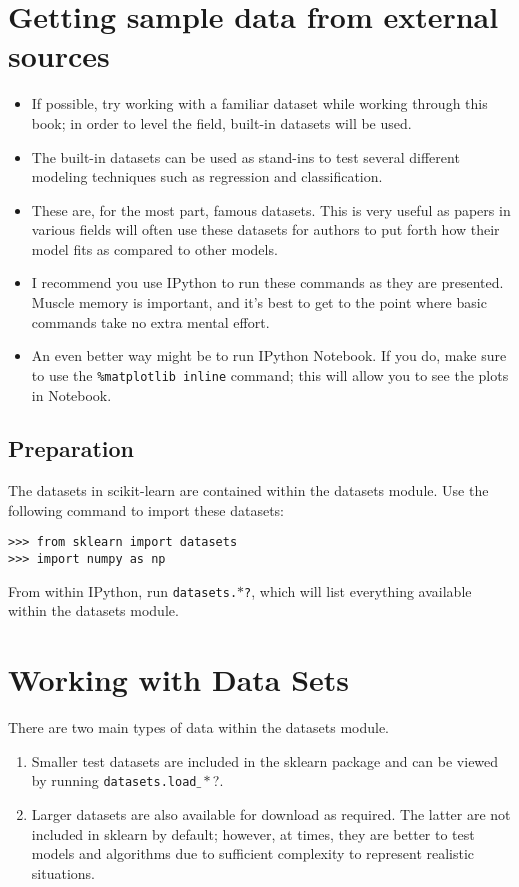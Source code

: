 \documentclass[SKL-MASTER.tex]{subfiles}
\begin{document}
\Large
\section*{Getting sample data from external sources}
\begin{itemize}
\item If possible, try working with a familiar dataset while working through this book; in order to level
the field, built-in datasets will be used. 
\item The built-in datasets can be used as stand-ins to test
several different modeling techniques such as regression and classification.
\item  These are, for the
most part, famous datasets. This is very useful as papers in various fields will often use these
datasets for authors to put forth how their model fits as compared to other models.

\item I recommend you use IPython to run these commands as they are
presented. Muscle memory is important, and it's best to get to the
point where basic commands take no extra mental effort. \item An even
better way might be to run IPython Notebook. If you do, make sure
to use the \texttt{\%matplotlib inline} command; this will allow you
to see the plots in Notebook.
\end{itemize}

\subsection*{Preparation}
The datasets in scikit-learn are contained within the datasets module. Use the following
command to import these datasets:
\begin{framed}
\begin{verbatim}
>>> from sklearn import datasets
>>> import numpy as np
\end{verbatim}
\end{framed}
From within IPython, run \texttt{datasets.$\ast$?}, which will list everything available within the
datasets module.
\section*{Working with Data Sets}
There are two main types of data within the datasets module. 
\begin{enumerate}
\item Smaller test datasets
are included in the sklearn package and can be viewed by running \texttt{datasets.load}$\_\ast$?.

\item Larger datasets are also available for download as required. The latter are not included in
sklearn by default; however, at times, they are better to test models and algorithms due
to sufficient complexity to represent realistic situations.
\end{enumerate}
\end{document}

